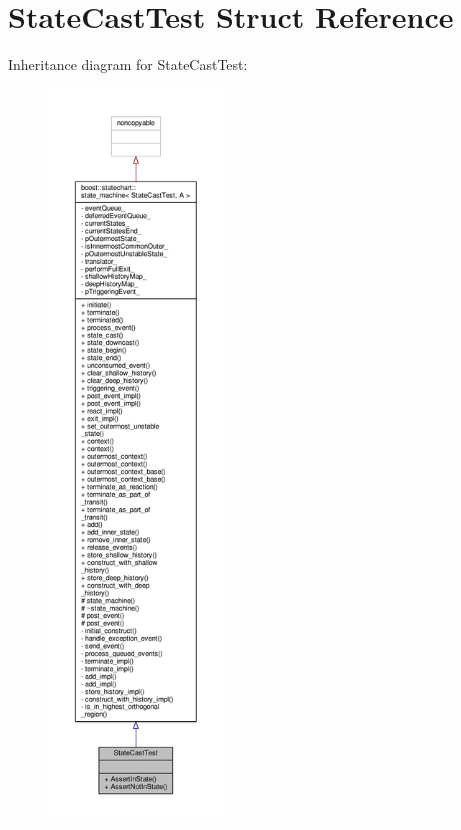 \hypertarget{struct_state_cast_test}{}\section{State\+Cast\+Test Struct Reference}
\label{struct_state_cast_test}


Inheritance diagram for State\+Cast\+Test\+:
\nopagebreak
\begin{figure}[H]
\begin{center}
\leavevmode
\includegraphics[height=550pt]{struct_state_cast_test__inherit__graph}
\end{center}
\end{figure}


